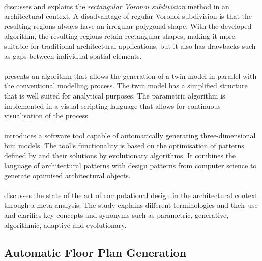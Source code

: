 \documentclass[a4paper, 12pt]{report}
\begin{document}
\paragraph{\cite{chatzikonstantinou20143}} discusses and explains the \textit{rectangular Voronoi subdivision} method in an architectural context. A disadvantage of regular Voronoi subdivision is that the resulting regions always have an irregular polygonal shape. With the developed algorithm, the resulting regions retain rectangular shapes, making it more suitable for traditional architectural applications, but it also has drawbacks such as gaps between individual spatial elements.

\paragraph{\cite{aguiar2017algorithmic}} presents an algorithm that allows the generation of a twin model in parallel with the conventional modelling process. The twin model has a simplified structure that is well suited for analytical purposes. The parametric algorithm is implemented in a visual scripting language that allows for continuous visualisation of the process.

\paragraph{\cite{postle2019pattern}} introduces a software tool capable of automatically generating three-dimensional \acrshort{bim} models. The tool's functionality is based on the optimisation of patterns defined by \citeauthor{alexander1977pattern} and their solutions by evolutionary algorithms. It combines the language of architectural patterns with design patterns from computer science to generate optimised architectural objects.

\paragraph{\cite{caetano2020computational}} discusses the state of the art of computational design in the architectural context through a meta-analysis. The study explains different terminologies and their use and clarifies key concepts and synonyms such as parametric, generative, algorithmic, adaptive and evolutionary.

\subsection*{Automatic Floor Plan Generation}\label{subsec:automatic-floor-plan-generation-fr}
\end{document}
